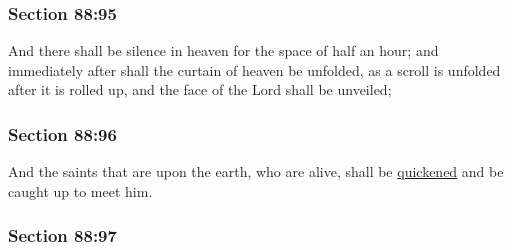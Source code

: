
	\subsubsection{Section 88:95} %
		\label{DC88-95}

		And there shall be silence in heaven for the space of half an hour; and immediately after shall the curtain of heaven be unfolded, as a scroll is unfolded after it is rolled up, and the face of the Lord shall be unveiled;


	\subsubsection{Section 88:96} %
		\label{DC88-96}

		And the saints that are upon the earth, who are alive, shall be \hyperref[QUICKEN]{quickened} and be caught up to meet him.


	\subsubsection{Section 88:97} %
		\label{DC88-97}

